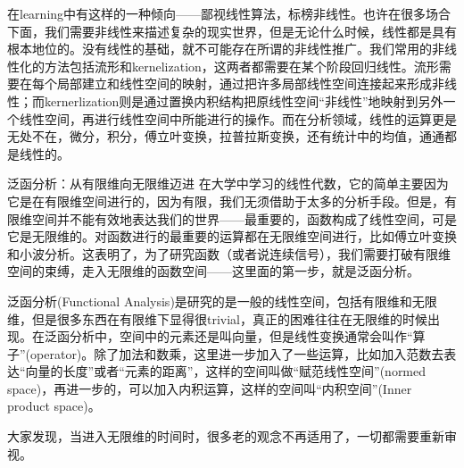 在learning中有这样的一种倾向——鄙视线性算法，标榜非线性。也许在很多场合下面，我们需要非线性来描述复杂的现实世界，但是无论什么时候，线性都是具有根本地位的。没有线性的基础，就不可能存在所谓的非线性推广。我们常用的非线性化的方法包括流形和kernelization，这两者都需要在某个阶段回归线性。流形需要在每个局部建立和线性空间的映射，通过把许多局部线性空间连接起来形成非线性；而kernerlization则是通过置换内积结构把原线性空间“非线性”地映射到另外一个线性空间，再进行线性空间中所能进行的操作。而在分析领域，线性的运算更是无处不在，微分，积分，傅立叶变换，拉普拉斯变换，还有统计中的均值，通通都是线性的。

泛函分析：从有限维向无限维迈进
在大学中学习的线性代数，它的简单主要因为它是在有限维空间进行的，因为有限，我们无须借助于太多的分析手段。但是，有限维空间并不能有效地表达我们的世界——最重要的，函数构成了线性空间，可是它是无限维的。对函数进行的最重要的运算都在无限维空间进行，比如傅立叶变换和小波分析。这表明了，为了研究函数（或者说连续信号），我们需要打破有限维空间的束缚，走入无限维的函数空间——这里面的第一步，就是泛函分析。

泛函分析(Functional Analysis)是研究的是一般的线性空间，包括有限维和无限维，但是很多东西在有限维下显得很trivial，真正的困难往往在无限维的时候出现。在泛函分析中，空间中的元素还是叫向量，但是线性变换通常会叫作“算子”(operator)。除了加法和数乘，这里进一步加入了一些运算，比如加入范数去表达“向量的长度”或者“元素的距离”，这样的空间叫做“赋范线性空间”(normed space)，再进一步的，可以加入内积运算，这样的空间叫“内积空间”(Inner product space)。

大家发现，当进入无限维的时间时，很多老的观念不再适用了，一切都需要重新审视。

